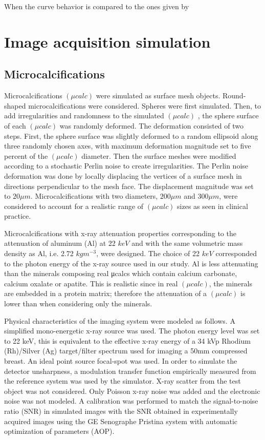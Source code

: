 When the curve behavior is compared to the ones given by \cite{de_pain_2015} 


\section{Image acquisition simulation }
\subsection{Microcalcifications}
Microcalcifications $(\mu calc)$ were simulated as surface mesh objects. Round-shaped microcalcifications were considered. Spheres were first simulated. Then, to add irregularities and randomness to the simulated $(\mu calc)$ , the sphere surface of each $(\mu calc)$  was randomly deformed. The deformation consisted of two steps. First, the sphere surface was slightly deformed to a random ellipsoid along three randomly chosen axes, with maximum deformation magnitude set to five percent of the $(\mu calc)$  diameter. Then the surface meshes were modified according to a stochastic Perlin noise to create irregularities. The Perlin noise deformation was done by locally displacing the vertices of a surface mesh in directions perpendicular to the mesh face. The displacement magnitude was set to $20 \mu m$.
Microcalcifications with two diameters, $200 \mu m$ and $300 \mu m$, were considered to account for a realistic range of $(\mu calc)$ sizes as seen in clinical practice.

Microcalcifications with x-ray attenuation properties corresponding to the attenuation of aluminum (Al) at 22 $keV$ and with the same volumetric mass density as Al, i.e. 2.72 $kgm^{−3}$, were designed. 
The choice of 22 $keV$ corresponded to the photon energy of the x-ray source used in our study. Al is less attenuating than the minerals composing real μcalcs which contain calcium carbonate, calcium oxalate or apatite. This is realistic since in real $(\mu calc)$, the minerals are embedded in a protein matrix; therefore the attenuation of a $(\mu calc)$ is lower than when considering only the minerals.

Physical characteristics of the imaging system were modeled as follows. A simplified
mono-energetic x-ray source was used. The photon energy level was set to 22 keV, this is equivalent to the effective x-ray energy of a 34 kVp Rhodium (Rh)/Silver (Ag) target/filter spectrum used for imaging a 50mm compressed breast. An ideal point source focal-spot was used. In order to simulate the detector unsharpness, a modulation transfer function empirically measured from the reference system was used by the simulator. X-ray scatter from the test object was not considered. Only Poisson x-ray noise was added and the electronic noise was not modeled.
A calibration was performed to match the signal-to-noise ratio (SNR) in simulated images with the SNR obtained in experimentally acquired images using the GE Senographe
Pristina system with automatic optimization of parameters (AOP).

